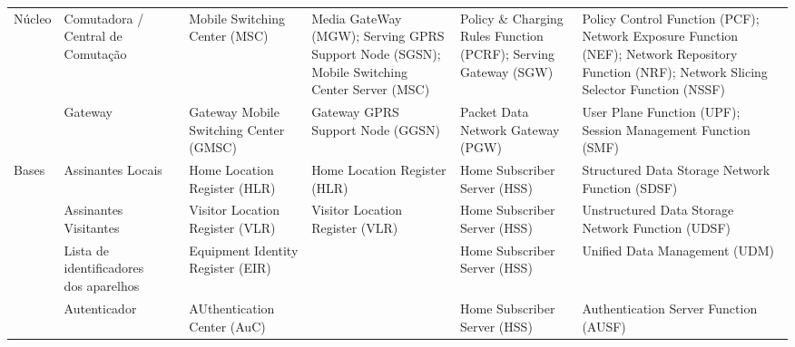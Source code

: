 \documentclass[11pt,oneside,a4paper]{abntex2}
\begin{document}
\begin{center}
\begin{longtable}{|m{1.5cm}|m{2.5cm}|l|m{2cm}|m{2cm}|m{2cm}|m{2cm}|}
\multirow{2}{*}{Núcleo} & Comutadora / Central de Comutação      &    & Mobile Switching Center (MSC)            & Media GateWay (MGW); Serving GPRS Support Node (SGSN); Mobile Switching Center Server (MSC) & Policy \& Charging Rules Function (PCRF); Serving Gateway (SGW) & Policy Control Function (PCF); Network Exposure Function (NEF); Network Repository Function (NRF); Network Slicing Selector Function (NSSF) \\ \cline{2-7} 
                        & Gateway                                &    & Gateway Mobile Switching Center (GMSC)   & Gateway GPRS Support Node (GGSN)                                                            & Packet Data Network Gateway (PGW)                               & User Plane Function (UPF); Session Management Function (SMF)                                                                                \\ \hline
\multirow{4}{*}{Bases}  & Assinantes Locais                      &    & Home Location Register (HLR)             & Home Location Register (HLR)                                                                & Home Subscriber Server (HSS)                                    & Structured Data Storage Network Function (SDSF)                                                                                             \\ \cline{2-7} 
                        & Assinantes Visitantes                  &    & Visitor Location Register (VLR)          & Visitor Location Register (VLR)                                                             & Home Subscriber Server (HSS)                                    & Unstructured Data Storage Network Function (UDSF)                                                                                           \\ \cline{2-7} 
                        & Lista de identificadores dos aparelhos &    & Equipment Identity Register (EIR)        &                                                                                             & Home Subscriber Server (HSS)                                    & Unified Data Management (UDM)                                                                                                               \\ \cline{2-7} 
                        & Autenticador                           &    & AUthentication Center (AuC)              &                                                                                             & Home Subscriber Server (HSS)                                    & Authentication Server Function (AUSF)                                                                                                       \\ \hline
\end{longtable}
\end{center}
\end{document}
